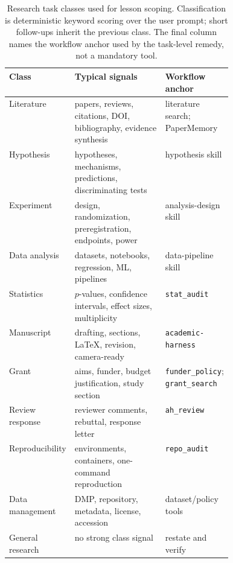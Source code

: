\begin{table}[t]
\centering
\footnotesize
\caption{Research task classes used for lesson scoping. Classification is deterministic keyword scoring over the user prompt; short follow-ups inherit the previous class. The final column names the workflow anchor used by the task-level remedy, not a mandatory tool.}
\label{tab:task-classes}
\begin{tabularx}{\linewidth}{@{}>{\raggedright\arraybackslash}p{0.16\linewidth}>{\raggedright\arraybackslash}X>{\raggedright\arraybackslash}p{0.27\linewidth}@{}}
\toprule
Class & Typical signals & Workflow anchor \\
\midrule
Literature & papers, reviews, citations, DOI, bibliography, evidence synthesis & literature search; PaperMemory \\
Hypothesis & hypotheses, mechanisms, predictions, discriminating tests & hypothesis skill \\
Experiment & design, randomization, preregistration, endpoints, power & analysis-design skill \\
Data analysis & datasets, notebooks, regression, ML, pipelines & data-pipeline skill \\
Statistics & $p$-values, confidence intervals, effect sizes, multiplicity & \texttt{stat\_audit} \\
Manuscript & drafting, sections, \LaTeX{}, revision, camera-ready & \texttt{academic-harness} \\
Grant & aims, funder, budget justification, study section & \texttt{funder\_policy}; \texttt{grant\_search} \\
Review response & reviewer comments, rebuttal, response letter & \texttt{ah\_review} \\
Reproducibility & environments, containers, one-command reproduction & \texttt{repo\_audit} \\
Data management & DMP, repository, metadata, license, accession & dataset/policy tools \\
General research & no strong class signal & restate and verify \\
\bottomrule
\end{tabularx}
\end{table}
